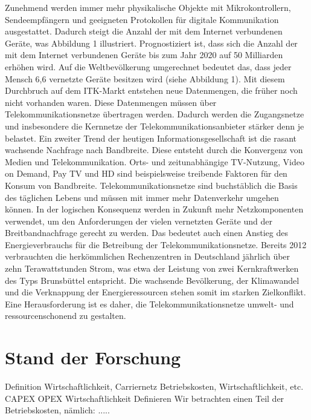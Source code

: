 \documentclass[12pt,titlepage]{article}
\begin{document}
Zunehmend werden immer mehr physikalische Objekte mit Mikrokontrollern, Sendeempfängern und geeigneten Protokollen für digitale Kommunikation ausgestattet. Dadurch steigt die Anzahl der mit dem Internet verbundenen Geräte, was Abbildung 1 illustriert. Prognostiziert ist, dass sich die Anzahl der mit dem Internet verbundenen Geräte bis zum Jahr 2020 auf 50 Milliarden erhöhen wird. Auf die Weltbevölkerung umgerechnet bedeutet das, dass jeder Mensch 6,6 vernetzte Geräte besitzen wird (siehe Abbildung 1). Mit diesem Durchbruch auf dem ITK-Markt entstehen neue Datenmengen, die früher noch nicht vorhanden waren. Diese Datenmengen müssen über Telekommunikationsnetze übertragen werden. Dadurch werden die Zugangsnetze und insbesondere die Kernnetze der Telekommunikationsanbieter stärker denn je belastet.  
Ein zweiter Trend der heutigen Informationsgesellschaft ist die rasant wachsende Nachfrage nach Bandbreite. Diese entsteht durch die Konvergenz von Medien und Telekommunikation. Orts- und zeitunabhängige TV-Nutzung, Video on Demand, Pay TV und HD sind beispielsweise treibende Faktoren für den Konsum von Bandbreite. 
Telekommunikationsnetze sind buchstäblich die Basis des täglichen Lebens und müssen mit immer mehr Datenverkehr umgehen können. In der logischen Konsequenz werden in Zukunft mehr Netzkomponenten verwendet, um den Anforderungen der vielen vernetzten Geräte und der Breitbandnachfrage gerecht zu werden. Das bedeutet auch einen Anstieg des Energieverbrauchs für die Betreibung der Telekommunikationsnetze. Bereits 2012 verbrauchten die herkömmlichen Rechenzentren in Deutschland jährlich über zehn Terawattstunden Strom, was etwa der Leistung von zwei Kernkraftwerken des Typs Brunsbüttel entspricht. Die wachsende Bevölkerung, der Klimawandel und die Verknappung der Energieressourcen stehen somit im starken Zielkonflikt. Eine Herausforderung ist es daher, die Telekommunikationsnetze umwelt- und ressourcenschonend zu gestalten. 



\section{Stand der Forschung} \label{SdF}
Definition Wirtschaftlichkeit, Carriernetz
Betriebskosten, Wirtschaftlichkeit, etc.
CAPEX OPEX
Wirtschaftlichkeit
Definieren
Wir betrachten einen Teil der Betriebskosten, nämlich: .....
\end{document}
